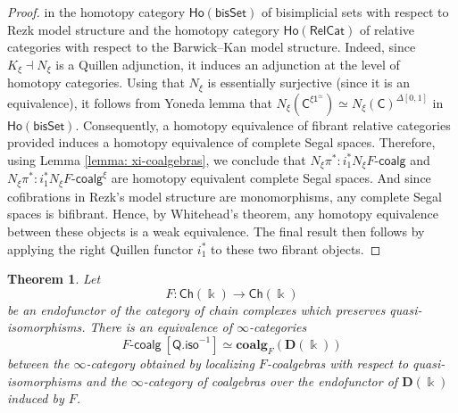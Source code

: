 \documentclass{proc-l}
\newcommand{\ho}[1]{\mathsf{Ho}(#1)}
\theoremstyle{plain}
\newtheorem{theorem}{Theorem}[section]
\theoremstyle{definition}
\theoremstyle{remark}
\newcommand{\kk}{\Bbbk}
\begin{document}
\begin{proof}
in the homotopy category $\ho{\mathsf{bisSet}}$ of bisimplicial sets with respect to Rezk model structure and the homotopy category $\ho{\mathsf{RelCat}}$ of relative categories with respect to the Barwick--Kan model structure. Indeed, since $K_\xi \dashv N_\xi$ is a Quillen adjunction, it induces an adjunction at the level of homotopy categories. Using that $N_\xi$ is essentially surjective (since it is an equivalence), it follows from Yoneda lemma that $N_{\xi}(\mathsf{C}^{\xi\mathsf{1}^{\simeq}}) \simeq N_{\xi}(\mathsf{C})^{\Delta[0,1]}$ in $\ho{\mathsf{bisSet}}$. Consequently, a homotopy equivalence of fibrant relative categories provided induces a homotopy equivalence of complete Segal spaces. Therefore, using Lemma \ref{lemma: xi-coalgebras}, we conclude that $N_{\xi}\pi^*:i_1^*N_{\xi}F\text{-}\mathsf{coalg}$ and $N_{\xi}\pi^*:i_1^*N_{\xi}F\text{-}\mathsf{coalg}^{\xi}$ are homotopy equivalent complete Segal spaces. And since cofibrations in Rezk's model structure are monomorphisms, any complete Segal spaces is bifibrant. Hence, by Whitehead's theorem, any homotopy equivalence between these objects is a  weak equivalence. The final result then follows by applying the right Quillen functor $i_1^*$ to these two fibrant objects.
\end{proof}

\begin{theorem}%
\label{Theorem:4.9}\label{thm: rectification of coalgebras over an endofunctor}
Let
\[
F: \mathsf{Ch}(\kk) \longrightarrow \mathsf{Ch}(\kk)
\]
be an endofunctor of the category of chain complexes which preserves quasi-isomorphisms. There is an equivalence of
$\infty$-categories
\[
F\text{-}\mathsf{coalg}~[\mathsf{Q.iso}^{-1}] \simeq \mathbf{coalg}_{F}(\mathbf{D}(\kk))
\]
between the $\infty$-category obtained by localizing $F$-coalgebras with respect to quasi-isomorphisms and the $\infty$-category of coalgebras over the endofunctor of $\mathbf{D}(\kk)$ induced by $F$.
\end{theorem}
\end{document}
